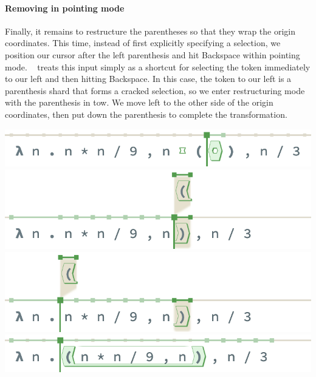 

\paragraph{Removing in pointing mode}
Finally, it remains to restructure the parentheses
so that they wrap the origin coordinates.
This time, instead of first explicitly specifying a selection,
we position our cursor after the left parenthesis
and hit Backspace within pointing mode.
\tylr~ treats this input simply as a shortcut for selecting the
token immediately to our left and then hitting Backspace.
In this case, the token to our left is a parenthesis
shard that forms a cracked selection, so we
enter restructuring mode with the parenthesis in tow.
We move left to the other side of the origin coordinates,
then put down the parenthesis to complete the transformation.
\begin{center}
  \includegraphics[width=0.6\columnwidth]{img/remove-pointing-0.png}
  \includegraphics[width=0.6\columnwidth]{img/remove-pointing-1.png}
  \includegraphics[width=0.6\columnwidth]{img/remove-pointing-2.png}
  \includegraphics[width=0.6\columnwidth]{img/remove-pointing-3.png}
\end{center}

